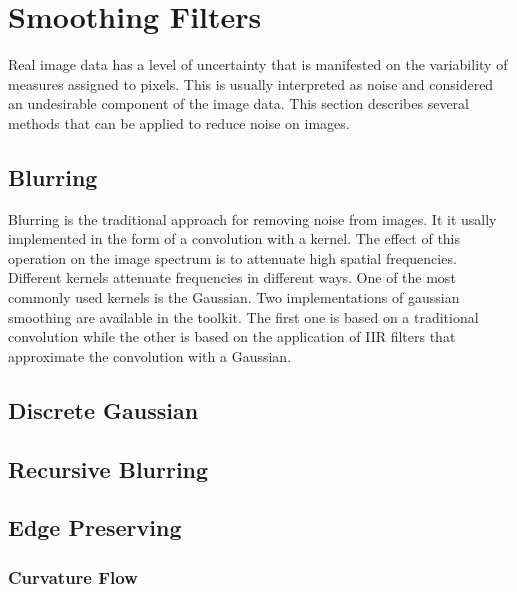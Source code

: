 \section{Smoothing Filters}
\label{sec:SmoothingFilters}

Real image data has a level of uncertainty that is manifested on the
variability of measures assigned to pixels. This is usually interpreted as
noise and considered an undesirable component of the image data. This section
describes several methods that can be applied to reduce noise on images.

\subsection{Blurring}
\label{sec:BlurringFilters}

Blurring is the traditional approach for removing noise from images. It it
usally implemented in the form of a convolution with a kernel. The effect of
this operation on the image spectrum is to attenuate high spatial frequencies.
Different kernels attenuate frequencies in different ways. One of the most
commonly used kernels is the Gaussian. Two implementations of gaussian
smoothing are available in the toolkit. The first one is based on a traditional
convolution while the other is based on the application of IIR filters that
approximate the convolution with a Gaussian. 

\subsection{Discrete Gaussian}
\label{sec:DiscreteGaussianImageFilter}




\subsection{Recursive Blurring}
\label{sec:RecursiveGaussianSmoothingFilter}


\subsection{Edge Preserving}
\label{sec:EdgePreservingFilters}


\subsubsection{Curvature Flow}
\label{sec:CurvatureFlowImageFilter}

